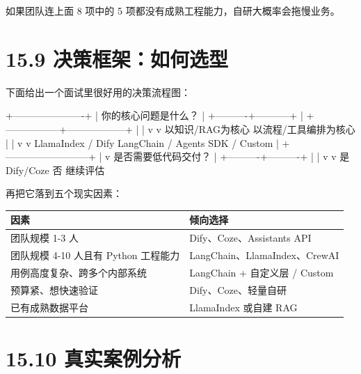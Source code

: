 如果团队连上面 8 项中的 5 项都没有成熟工程能力，自研大概率会拖慢业务。


\section{15.9 决策框架：如何选型}

下面给出一个面试里很好用的决策流程图：


\begin{codeblock}
                 +----------------------+
                 | 你的核心问题是什么？   |
                 +----------+-----------+
                            |
          +-----------------+------------------+
          |                                    |
          v                                    v
   以知识/RAG为核心                      以流程/工具编排为核心
          |                                    |
          v                                    v
   LlamaIndex / Dify                    LangChain / Agents SDK / Custom
          |
          +--------------------------+
                                     |
                                     v
                              是否需要低代码交付？
                                     |
                          +----------+----------+
                          |                     |
                          v                     v
                        是 Dify/Coze         否 继续评估
\end{codeblock}

再把它落到五个现实因素：


\begingroup
\scriptsize
\setlength{\tabcolsep}{3pt}
\begin{longtable}{|p{}|p{}|}
\hline
因素 & 倾向选择 \\ \hline
团队规模 1-3 人 & Dify、Coze、Assistants API \\ \hline
团队规模 4-10 人且有 Python 工程能力 & LangChain、LlamaIndex、CrewAI \\ \hline
用例高度复杂、跨多个内部系统 & LangChain + 自定义层 / Custom \\ \hline
预算紧、想快速验证 & Dify、Coze、轻量自研 \\ \hline
已有成熟数据平台 & LlamaIndex 或自建 RAG \\ \hline
\end{longtable}
\endgroup

\section{15.10 真实案例分析}

